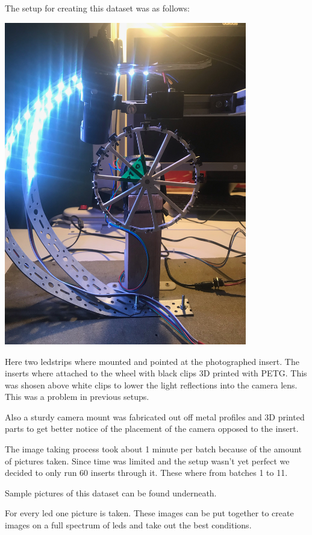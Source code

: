 The setup for creating this dataset was as follows:

\includegraphics[width=4.166667in, keepaspectratio=true]{./fig/Vision/Dataset/automated_datasets/2_created_datasets/1_Birthday_dataset/IMG_9282.jpeg}

Here two ledstrips where mounted and pointed at the photographed insert. The inserts where attached to the wheel with black clips 3D printed with PETG. This was shosen above white clips to lower the light reflections into the camera lens. This was a problem in previous setups. 

Also a sturdy camera mount was fabricated out off metal profiles and 3D printed parts to get better notice of the placement of the camera opposed to the insert. 

The image taking process took about 1 minute per batch because of the amount of pictures taken. Since time was limited and the setup wasn't yet perfect we decided to only run 60 inserts through it. These where from batches 1 to 11. 

Sample pictures of this dataset can be found underneath. 

For every led one picture is taken. These images can be put together to create images on a full spectrum of leds and take out the best conditions. 

